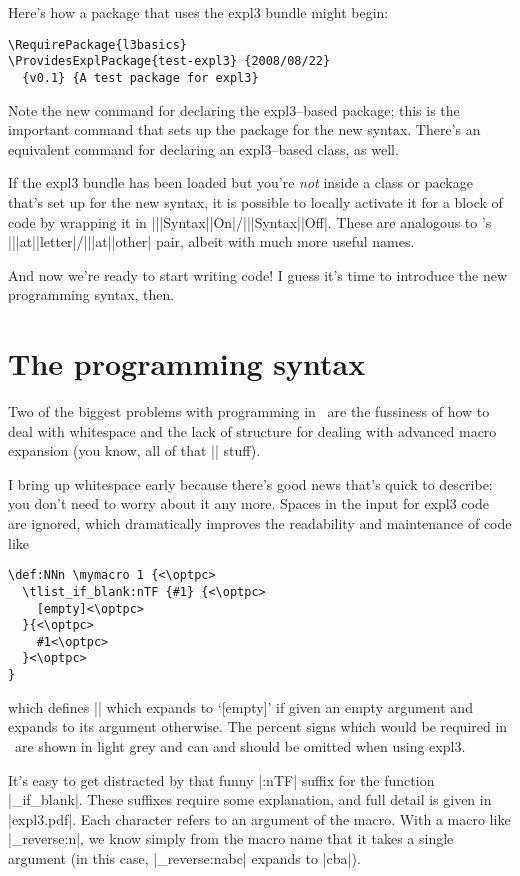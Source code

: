 \documentclass{ltugboat}
\def\pkg#1{\textsf{#1}}
\begin{document}
Here's how a package that uses the \pkg{expl3} bundle might begin:
\begin{lstlisting}
\RequirePackage{l3basics}
\ProvidesExplPackage{test-expl3} {2008/08/22}
  {v0.1} {A test package for expl3}
\end{lstlisting}
Note the new command for declaring the \pkg{expl3}--based package; this is the
important command that sets up the package for the new syntax. There's an
equivalent command for declaring an \pkg{expl3}--based class, as well.

If the \pkg{expl3} bundle has been loaded but you're \emph{not} inside a class
or package that's set up for the new syntax, it is possible to locally
activate it for a block of code by wrapping it in
|\Expl|\-|Syntax|\-|On|/|\Expl|\-|Syntax|\-|Off|. These are
analogous to \LaTeXe's |\make|\-|at|\-|letter|/|\make|\-|at|\-|other| pair,
albeit with much more useful names.

And now we're ready to start writing code! I guess it's time to introduce the
new programming syntax, then.

\section{The programming syntax}

Two of the biggest problems with programming in \LaTeXe\ are the fussiness of
how to deal with whitespace and the lack of structure for dealing with
advanced macro expansion (you know, all of that |\expandafter| stuff).

I bring up whitespace early because there's good news that's quick to
describe: you don't need to worry about it any more. Spaces in the input for
\pkg{expl3} code are ignored, which dramatically improves the readability and
maintenance of code like
\def\optpc{\textcolor[gray]{0.7}{\%}}
\begin{lstlisting}[escapeinside=<>]
\def:NNn \mymacro 1 {<\optpc>
  \tlist_if_blank:nTF {#1} {<\optpc>
    [empty]<\optpc>
  }{<\optpc>
    #1<\optpc>
  }<\optpc>
}
\end{lstlisting}
which defines |\mymacro| which expands to `[empty]' if given an empty argument
and expands to its argument otherwise. The percent signs which would be
required in \LaTeXe\ are shown in light grey and can and should be omitted
when using \pkg{expl3}.

It's easy to get distracted by that funny |:nTF| suffix for the function
|\tlist_if_blank|. These suffixes require some explanation, and full detail is
given in |expl3.pdf|. Each character refers to an argument of the macro. With
a macro like |\tlist_reverse:n|, we know simply from the macro name that it
takes a single argument (in this case, |\tlist_reverse:n{abc}| expands to
|cba|).
\end{document}
